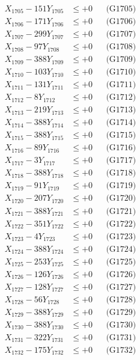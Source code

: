 \documentclass[a4paper,10pt]{article}
\begin{document}
{\begin{align}
X_{1705} - 151Y_{1705} &\leq +0 && \text{(G1705)} \\
X_{1706} - 171Y_{1706} &\leq +0 && \text{(G1706)} \\
X_{1707} - 299Y_{1707} &\leq +0 && \text{(G1707)} \\
X_{1708} - 97Y_{1708} &\leq +0 && \text{(G1708)} \\
X_{1709} - 388Y_{1709} &\leq +0 && \text{(G1709)} \\
X_{1710} - 103Y_{1710} &\leq +0 && \text{(G1710)} \\
\allowbreak
X_{1711} - 131Y_{1711} &\leq +0 && \text{(G1711)} \\
X_{1712} - 8Y_{1712} &\leq +0 && \text{(G1712)} \\
X_{1713} - 219Y_{1713} &\leq +0 && \text{(G1713)} \\
X_{1714} - 388Y_{1714} &\leq +0 && \text{(G1714)} \\
X_{1715} - 388Y_{1715} &\leq +0 && \text{(G1715)} \\
X_{1716} - 89Y_{1716} &\leq +0 && \text{(G1716)} \\
X_{1717} - 3Y_{1717} &\leq +0 && \text{(G1717)} \\
X_{1718} - 388Y_{1718} &\leq +0 && \text{(G1718)} \\
X_{1719} - 91Y_{1719} &\leq +0 && \text{(G1719)} \\
X_{1720} - 207Y_{1720} &\leq +0 && \text{(G1720)} \\
\allowbreak
X_{1721} - 388Y_{1721} &\leq +0 && \text{(G1721)} \\
X_{1722} - 351Y_{1722} &\leq +0 && \text{(G1722)} \\
X_{1723} - 4Y_{1723} &\leq +0 && \text{(G1723)} \\
X_{1724} - 388Y_{1724} &\leq +0 && \text{(G1724)} \\
X_{1725} - 253Y_{1725} &\leq +0 && \text{(G1725)} \\
X_{1726} - 126Y_{1726} &\leq +0 && \text{(G1726)} \\
X_{1727} - 128Y_{1727} &\leq +0 && \text{(G1727)} \\
X_{1728} - 56Y_{1728} &\leq +0 && \text{(G1728)} \\
X_{1729} - 388Y_{1729} &\leq +0 && \text{(G1729)} \\
X_{1730} - 388Y_{1730} &\leq +0 && \text{(G1730)} \\
\allowbreak
X_{1731} - 322Y_{1731} &\leq +0 && \text{(G1731)} \\
X_{1732} - 175Y_{1732} &\leq +0 && \text{(G1732)} \\

\end{align}}
\end{document}
